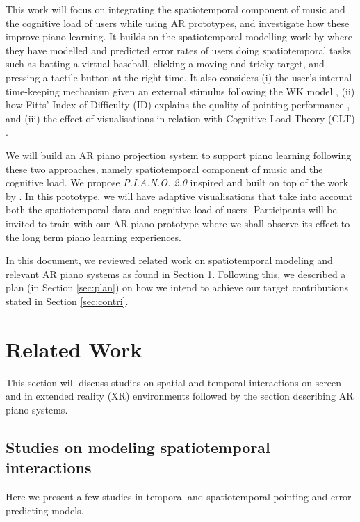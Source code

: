 \documentclass[manuscript,screen]{acmart}
\begin{document}
This work will focus on integrating the spatiotemporal component of music and the cognitive load of users while using AR prototypes, and investigate how these improve piano learning. It builds on the spatiotemporal modelling work by \citet{lee2016modelling, lee2017boxer, kim2018impact, liao2020button} where they have modelled and predicted error rates of users doing spatiotemporal tasks such as batting a virtual baseball, clicking a moving and tricky target, and pressing a tactile button at the right time. It also considers (i) the user's internal time-keeping mechanism given an external stimulus following the WK model \cite{wing1973response, wing1973timing}, (ii) how Fitts' Index of Difficulty (ID) explains the quality of pointing performance \cite{mackenzie1992extending, park2020intermittent}, and (iii) the effect of visualisations in relation with Cognitive Load Theory (CLT) \cite{klepsch2017development}.

We will build an AR piano projection system to support piano learning following these two approaches, namely spatiotemporal component of music and the cognitive load. We propose \textit{P.I.A.N.O. 2.0} inspired and built on top of the work by \citet{rogers2014piano}. In this prototype, we will have adaptive visualisations that take into account both the spatiotemporal data and cognitive load of users. Participants will be invited to train with our AR piano prototype where we shall observe its effect to the long term piano learning experiences.

In this document, we reviewed related work on spatiotemporal modeling and relevant AR piano systems as found in Section \ref{sec:rrl}. Following this, we described a plan (in Section \ref{sec:plan}) on how we intend to achieve our target contributions stated in Section \ref{sec:contri}.


\section{Related Work}
\label{sec:rrl}
This section will discuss studies on spatial and temporal interactions on screen and in extended reality (XR) environments followed by the section describing AR piano systems. 

\subsection{Studies on modeling spatiotemporal interactions}
Here we present a few studies in temporal and spatiotemporal pointing and error predicting models. 
\end{document}
